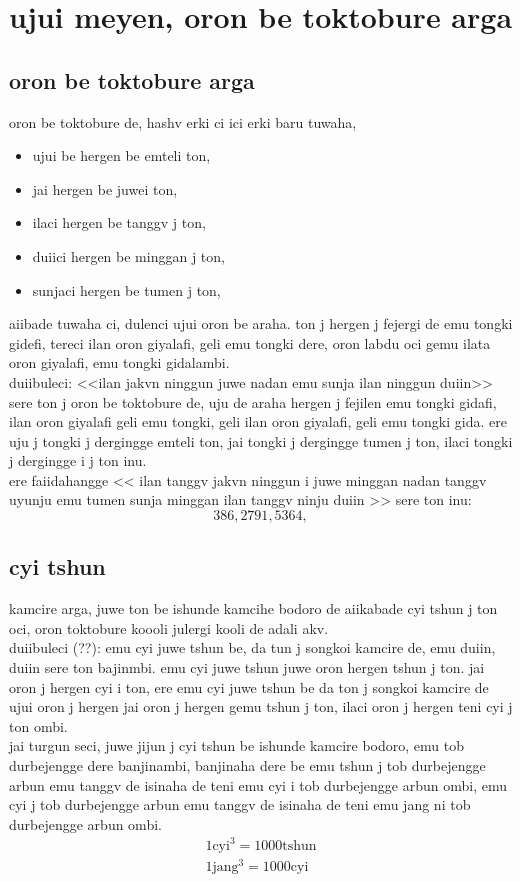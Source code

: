 \documentclass{report}
\begin{document}
\chapter{ujui meyen, oron be toktobure arga}
\section{oron be toktobure arga}
oron be toktobure de, hashv erki ci ici erki baru tuwaha, 
\begin{itemize}
    \item ujui be hergen be emteli ton,
    \item jai hergen be juwei ton,
    \item ilaci hergen be tanggv j ton,
    \item duiici hergen be minggan j ton,
    \item sunjaci hergen be tumen j ton,
\end{itemize}
aiibade tuwaha ci, dulenci ujui oron be araha. ton j hergen j fejergi de emu tongki gidefi, tereci ilan oron giyalafi,
geli emu tongki dere, oron labdu oci gemu ilata oron giyalafi, emu tongki gidalambi.\\ 
duiibuleci: <<ilan jakvn ninggun juwe nadan emu sunja ilan ninggun duiin>> sere ton j oron be toktobure de, uju de araha hergen j fejilen emu tongki gidafi, ilan oron giyalafi geli emu tongki, geli ilan oron giyalafi, geli emu tongki gida. ere uju j tongki j dergingge emteli ton, jai tongki j dergingge tumen j ton, ilaci tongki j dergingge i j ton inu.\\
ere faiidahangge << ilan tanggv jakvn ninggun i juwe minggan nadan tanggv uyunju emu tumen sunja minggan ilan tanggv ninju duiin >> sere ton inu:
\[
    386,2791,5364,
\]

\section{cyi tshun}
kamcire arga, juwe ton be ishunde kamcihe bodoro de aiikabade cyi tshun j ton oci, oron toktobure koooli julergi kooli de adali akv.\\
duiibuleci (??): emu cyi juwe tshun be, da tun j songkoi kamcire de, emu duiin, duiin sere ton bajinmbi. emu cyi juwe tshun juwe oron hergen tshun j ton. jai oron j hergen cyi i ton, ere emu cyi juwe tshun be da ton j songkoi kamcire de ujui oron j hergen jai 
oron j hergen gemu tshun j ton, ilaci oron j hergen teni cyi j ton ombi.\\
jai turgun seci, juwe jijun j cyi tshun be ishunde kamcire bodoro, emu tob durbejengge dere banjinambi, banjinaha dere be emu tshun j tob durbejengge arbun emu tanggv de isinaha de teni emu cyi i tob durbejengge arbun ombi, emu cyi j tob durbejengge arbun emu tanggv de isinaha de teni emu jang ni tob durbejengge arbun ombi.\\
\begin{align}
    1\mathrm{cyi}^3 = 1000 \mathrm{tshun}\\
    1\mathrm{jang}^3 = 1000 \mathrm{cyi}
\end{align}
\end{document}
